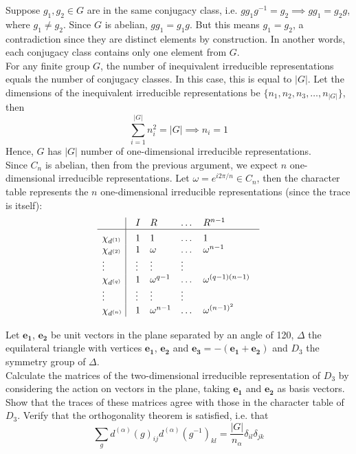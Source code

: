 \documentclass[a4paper]{article}
\begin{document}
\begin{ans}
Suppose $g_1,g_2\in G$ are in the same conjugacy class, i.e. $gg_1g^{-1}=g_2\implies gg_1=g_2g$, where $g_1\neq g_2$. Since $G$ is abelian, $gg_1=g_1g$. But this means $g_1=g_2$, a contradiction since they are distinct elements by construction. In another words, each conjugacy class contains only one element from $G$.\\[5pt]
For any finite group $G$, the number of inequivalent irreducible representations equals the number of conjugacy classes. In this case, this is equal to $|G|$. Let the dimensions of the inequivalent irreducible representations be $\{n_1,n_2,n_3,\dots, n_{|G|}\}$, then
$$\sum_{i=1}^{|G|}n_i^2=|G|\implies n_i=1$$
Hence, $G$ has $|G|$ number of one-dimensional irreducible representations.\\[5pt]
Since $C_n$ is abelian, then from the previous argument, we expect $n$ one-dimensional irreducible representations. Let $\omega=e^{i2\pi/n}\in C_n$, then the character table represents the $n$ one-dimensional irreducible representations (since the trace is itself):
$$\vbox{\tabskip0.5em\offinterlineskip
    \halign{\strut$#$\hfil\ \tabskip1em\vrule&&$#$\hfil\cr
     ~   & I   & R & \dots &R^{n-1} \cr
    \noalign{\hrule}\vrule height 12pt width 0pt
    \chi_{d^{(1)}}   & 1   & 1  & \dots &1      \cr
    \chi_{d^{(2)}}   & 1   & \omega & \dots & \omega^{n-1}      \cr
    \vdots   & \vdots   & \vdots  & \vdots    \cr
    \chi_{d^{(q)}}   & 1   & \omega^{q-1} & \dots & \omega^{(q-1)(n-1)}\cr
   \vdots   & \vdots   & \vdots  & \vdots    \cr
    \chi_{d^{(n)}}   & 1   & \omega^{n-1} & \dots & \omega^{(n-1)^2}\cr
}}$$
\end{ans}
\newpage
\begin{qns}
Let $\mathbf{e_1}$, $\mathbf{e_2}$ be unit vectors in the plane separated by an angle of 120\degree, $\Delta$ the equilateral triangle with vertices $\mathbf{e_1}$, $\mathbf{e_2}$ and $\mathbf{e_3} = −(\mathbf{e_1} + \mathbf{e_2})$ and $D_3$ the symmetry group of $\Delta$.\\[5pt]
Calculate the matrices of the two-dimensional irreducible representation of $D_3$ by considering the action on vectors in the plane, taking $\mathbf{e_1}$ and $\mathbf{e_2}$ as basis vectors. Show that the traces of these matrices agree with those in the character table of $D_3$. Verify that the orthogonality theorem is satisfied, i.e. that
$$\sum_gd^{(\alpha)}(g)_{ij}d^{(\alpha)}(g^{-1})_{kl}=\frac{|G|}{n_\alpha}\delta_{il}\delta_{jk}$$
\end{qns}
\end{document}
